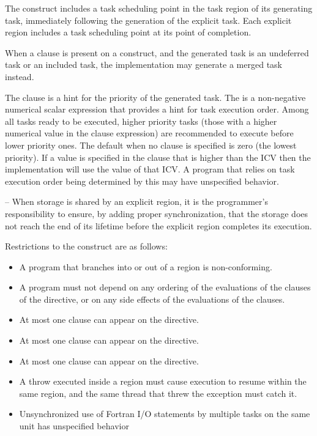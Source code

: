 The  construct includes a task scheduling point in the task region of its generating 
task, immediately following the generation of the explicit task. Each explicit  
region includes a task scheduling point at its point of completion. 

When a  clause is present on a  construct, and the generated task is 
an undeferred task or an included task, the implementation may generate a merged task 
instead.

The  clause is a hint for the priority of the generated task. The  is a
non-negative numerical scalar expression that provides a hint for task execution order. Among all
tasks ready to be executed, higher priority tasks (those with a higher numerical value in the
 clause expression) are recommended to execute before lower priority ones. The default
 when no  clause is specified is zero (the lowest priority). If a value is
specified in the  clause that is higher than the  ICV then the
implementation will use the value of that ICV. A program that relies on task execution order
being determined by this  may have unspecified behavior.

\notestart
\noteheader – When storage is shared by an explicit  region, it is the programmer's 
responsibility to ensure, by adding proper synchronization, that the storage does not 
reach the end of its lifetime before the explicit  region completes its execution.
\noteend

\restrictions
Restrictions to the  construct are as follows:

\begin{itemize}
\item A program that branches into or out of a  region is non-conforming. 

\item A program must not depend on any ordering of the evaluations of the clauses of the 
 directive, or on any side effects of the evaluations of the clauses. 

\item At most one  clause can appear on the directive. 

\item At most one  clause can appear on the directive.

\item At most one  clause can appear on the directive.

\ccppspecificstart
\item A throw executed inside a  region must cause execution to resume within the 
same  region, and the same thread that threw the exception must catch it.
\ccppspecificend

\fortranspecificstart
\item Unsynchronized use of Fortran I/O statements by multiple tasks on the same unit has 
unspecified behavior
\fortranspecificend
\end{itemize}


